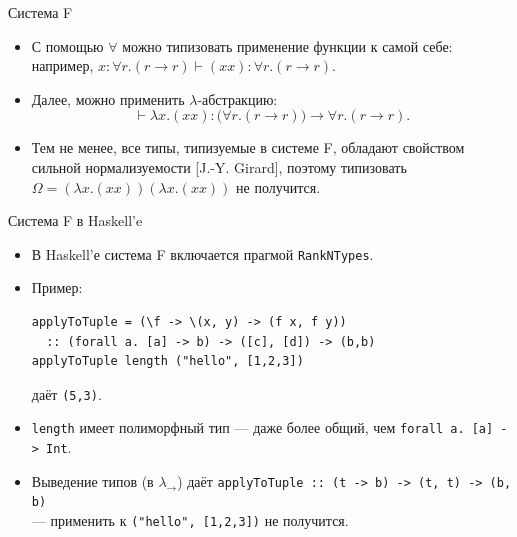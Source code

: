 \documentclass[xcolor=dvipsnames]{beamer}
\begin{document}
\begin{frame}{Система F}

\begin{itemize}
 \item С помощью $\forall$ можно типизовать применение функции к самой себе:
 например, $x : \forall r. (r \to r) \vdash
 (xx) : \forall r . (r \to r)$.
 \vspace*{-2em}
 \item<3-> Далее, можно применить $\lambda$-абстракцию:
 \vspace*{-1em}
 \[
  \vdash \lambda x. (xx) : \bigl(\forall r. (r \to r)\bigr) \to \forall r. (r \to r).
 \]
 \vspace*{-2em}
 \item<4-> Тем не менее, все типы, типизуемые в системе F, обладают свойством сильной нормализуемости [J.-Y. Girard], поэтому типизовать $\Omega = (\lambda x. (xx)) (\lambda x. (xx))$ не получится.

\end{itemize}

 
 
\end{frame}

\begin{frame}[fragile]{Система F в Haskell'e}
 
 
 \begin{itemize}[<+->]
  \item В Haskell'е система F включается прагмой \texttt{RankNTypes}.
  \item Пример:
\begin{verbatim}
applyToTuple = (\f -> \(x, y) -> (f x, f y)) 
  :: (forall a. [a] -> b) -> ([c], [d]) -> (b,b)
applyToTuple length ("hello", [1,2,3])
\end{verbatim}
даёт \texttt{(5,3)}.

\item \texttt{length} имеет полиморфный тип --- даже более общий, чем
\texttt{forall a. [a]}\texttt{ -> Int}.

\item Выведение типов (в $\lambda_\to$) даёт 
\texttt{applyToTuple :: (t -> b) -> (t, t) -> (b, b)} \\--- применить к 
\texttt{("hello", [1,2,3])} не получится.
 \end{itemize}

\end{frame}
\end{document}
